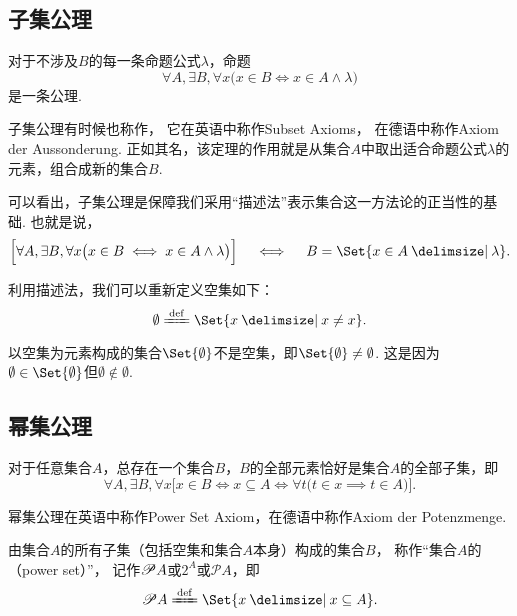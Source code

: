 \subsection{子集公理}
\begin{axiom}[子集公理]
对于不涉及\(B\)的每一条命题公式\(\lambda\)，命题\[
	\forall A, \exists B, \forall x \bigl(
		x \in B \iff x \in A \land \lambda
	\bigr)
\]是一条公理.
\end{axiom}
子集公理有时候也称作，%
它在英语中称作Subset Axioms，%
在德语中称作Axiom der Aussonderung.
正如其名，该定理的作用就是从集合\(A\)中取出适合命题公式\(\lambda\)的元素，组合成新的集合\(B\).

可以看出，子集公理是保障我们采用“描述法”表示集合这一方法论的正当性的基础.
也就是说，\[
\Bigl[
	\forall A, \exists B, \forall x \bigl(
		x \in B \iff x \in A \land \lambda
	\bigr)
\Bigr]
\quad\iff\quad
B = \Set{ x \in A \given \lambda }.
\]

利用描述法，我们可以重新定义空集如下：\[
	\emptyset \defeq \Set{ x \given x \neq x }.
\]

\begin{example}
以空集为元素构成的集合\(\Set{\emptyset}\)不是空集，即\(\Set{\emptyset} \neq \emptyset\).
这是因为\(\emptyset \in \Set{\emptyset}\)但\(\emptyset \notin \emptyset\).
\end{example}

\subsection{幂集公理}
\begin{axiom}[幂集公理]
对于任意集合\(A\)，总存在一个集合\(B\)，\(B\)的全部元素恰好是集合\(A\)的全部子集，即\[
\forall A, \exists B, \forall x \bigl[
	x \in B
	\iff
	x \subseteq A
	\iff
	\forall t \bigl( t \in x \implies t \in A \bigr)
\bigr].
\]
\end{axiom}
幂集公理在英语中称作Power Set Axiom，在德语中称作Axiom der Potenzmenge.

\begin{definition}
由集合\(A\)的所有子集（包括空集和集合\(A\)本身）构成的集合\(B\)，%
称作“集合\(A\)的（power set）”，%
记作\(\mathscr{P} A\)或\(2^A\)或\(\mathcal{P}A\)，即\[
\Powerset A
\defeq
\Set{ x \given x \subseteq A }.
\]
\end{definition}

